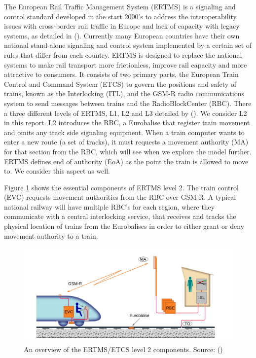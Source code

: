 \documentclass[preprint,12pt]{elsarticle}
\begin{document}
The European Rail Traffic Management System (ERTMS) is a signaling and control standard developed in the start 2000's to address the interoperability issues with cross-border rail traffic in Europe and lack of capacity with legacy systems, as detailed in (\citet{Ghazel2014}). Currently many European countries have their own national stand-alone signaling and control system implemented by a certain set of rules that differ from each country. ERTMS is designed to replace the national systems to make rail transport more frictionless, improve rail capacity and more attractive to consumers. It consists of two primary parts, the European Train Control and Command System (ETCS) to govern the positions and safety of trains, known as the Interlocking (ITL), and the GSM-R radio communications system to send messages between trains and the RadioBlockCenter (RBC). There a three different levels of ERTMS, L1, L2 and L3 detailed by (\citet{Outlook2012}). We consider L2 in this report. L2 introduces the RBC, a Eurobalise that register train movement and omits any track side signaling equipment. When a train computer wants to enter a new route (a set of tracks), it must requests a movement authority (MA) for that section from the RBC, which will see when we explore the model further. ERTMS defines end of authority (EoA) as the point the train is allowed to move to. We consider this aspect as well.

Figure \ref{fig:ertmsoverview} shows the essential components of ERTMS level 2. The train control (EVC) requests movement authorities from the RBC over GSM-R. A typical national railway will have multiple RBC's for each region, where they communicate with a central interlocking service, that receives and tracks the physical location of trains from the Eurobalises in order to either grant or deny movement authority to a train.

\begin{figure}[h]
	\centering
	\includegraphics[width=0.8\linewidth]{ERTMS.png}
	\caption{An overview of the ERTMS/ETCS level 2 components. Source: (\citet{Berger2018})}
	\label{fig:ertmsoverview}
\end{figure}
\end{document}
